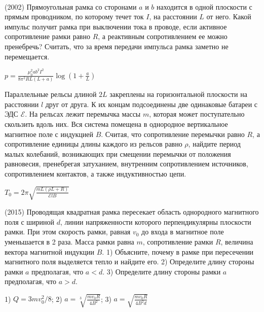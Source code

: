 \begin{ex}
\hspace{0pt} \\
\begin{minipage}{.65\textwidth}
(2002) Прямоугольная рамка со сторонами $a$ и $b$ находится в одной плоскости с прямым проводником, по которому течет ток $I$, на расстоянии $L$ от него. Какой импульс получит рамка при выключении тока в проводе, если активное сопротивление рамки равно $R$, а реактивным сопротивлением ее можно пренебречь? 
Считать, что за время передачи импульса рамка заметно не перемещается.
\end{minipage}
\begin{minipage}{.35\textwidth}
\centering

\end{minipage}
\begin{ans}
$p=\frac{\mu_0^2ab^2I^2}{8\pi^2RL(L+a)}\log\left( 1+\frac{a}{L} \right)$
\end{ans}
\end{ex}

\begin{ex}
Параллельные рельсы длиной $2L$ закреплены на горизонтальной плоскости на расстоянии $l$ друг от друга. 
К их концам подсоединены две одинаковые батареи с ЭДС  $\mathcal{E}$. На рельсах лежит перемычка массы $m$, 
которая может поступательно скользить вдоль них. Вся система помещена в однородное вертикальное магнитное поле с индукцией $B$. 
Считая, что сопротивление перемычки равно $R$, а сопротивление единицы длины каждого из рельсов равно $\rho$, найдите период малых колебаний, возникающих при смещении перемычки от положения равновесия, пренебрегая затуханием, внутренним сопротивлением источников, сопротивлением контактов, а также индуктивностью цепи.
\begin{center}

\end{center}
\begin{ans}
$T_0 = 2 \pi \sqrt{\frac{mL(\rho L + R)}{\mathcal{E}lB}}$
\end{ans}
\end{ex}

\begin{ex}
(2015) Проводящая квадратная рамка пересекает область однородного магнитного поля с шириной $d$, линии напряженности которого перпендикулярны плоскости рамки. При этом скорость рамки, равная $v_0$ до входа в магнитное поле уменьшается в 2 раза. Масса рамки равна $m$, сопротивление рамки $R$, величина вектора магнитной индукции $B$. 1) Объясните, почему в рамке при пересечении магнитного поля выделяется тепло и найдите его. 2) Определите длину стороны рамки $a$ предполагая, что $a<d$. 3) Определите длину стороны рамки $a$ предполагая, что $a>d$.
\begin{ans}
1) $Q = 3mv_0^2/8$; 2) $a=\sqrt[3]{\frac{mv_0R}{4B^2}}$; 3) $a=\sqrt{\frac{mv_0R}{4B^2d}}$
\end{ans}
\end{ex}
